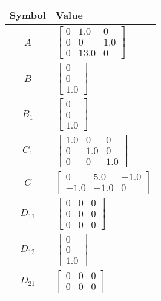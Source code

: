 \begin{tabular}{cl}
\hline
  Symbol  & Value                                                                           \\
\hline
   $A$    & $\left[\begin{matrix}0 & 1.0 & 0\\0 & 0 & 1.0\\0 & 13.0 & 0\end{matrix}\right]$ \\
   $B$    & $\left[\begin{matrix}0\\0\\1.0\end{matrix}\right]$                              \\
 $B_{1}$  & $\left[\begin{matrix}0\\0\\1.0\end{matrix}\right]$                              \\
 $C_{1}$  & $\left[\begin{matrix}1.0 & 0 & 0\\0 & 1.0 & 0\\0 & 0 & 1.0\end{matrix}\right]$  \\
   $C$    & $\left[\begin{matrix}0 & 5.0 & -1.0\\-1.0 & -1.0 & 0\end{matrix}\right]$        \\
 $D_{11}$ & $\left[\begin{matrix}0 & 0 & 0\\0 & 0 & 0\\0 & 0 & 0\end{matrix}\right]$        \\
 $D_{12}$ & $\left[\begin{matrix}0\\0\\1.0\end{matrix}\right]$                              \\
 $D_{21}$ & $\left[\begin{matrix}0 & 0 & 0\\0 & 0 & 0\end{matrix}\right]$                   \\
\hline
\end{tabular}